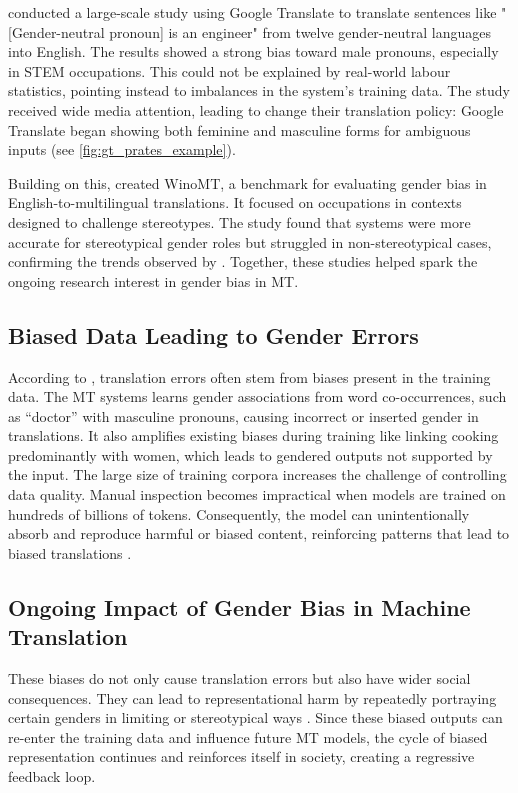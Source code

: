         \textcite{pratesAssessingGenderBias2019} conducted a large-scale study using Google Translate to translate sentences like "[Gender-neutral pronoun] is an engineer" from twelve gender-neutral languages into English. The results showed a strong bias toward male pronouns, especially in STEM occupations. This could not be explained by real-world labour statistics, pointing instead to imbalances in the system's training data. The study received wide media attention, leading \citeauthor{googleReducingGenderBias2018} to change their translation policy: Google Translate began showing both feminine and masculine forms for ambiguous inputs \parencite{googleReducingGenderBias2018} (see \autoref{fig:gt_prates_example}).

        Building on this, \textcite{stanovskyEvaluatingGenderBias2019} created WinoMT, a benchmark for evaluating gender bias in English-to-multilingual translations. It focused on occupations in contexts designed to challenge stereotypes. The study found that systems were more accurate for stereotypical gender roles but struggled in non-stereotypical cases, confirming the trends observed by \citeauthor{pratesAssessingGenderBias2019}.
        Together, these studies helped spark the ongoing research interest in gender bias in MT.

        \subsection{Biased Data Leading to Gender Errors}
        According to \textcite{ullmannGenderBiasMachine2022}, translation errors often stem from biases present in the training data. The MT systems learns gender associations from word co-occurrences, such as “doctor” with masculine pronouns, causing incorrect or inserted gender in translations. It also amplifies existing biases during training like linking cooking predominantly with women, which leads to gendered outputs not supported by the input. The large size of training corpora increases the challenge of controlling data quality. Manual inspection becomes impractical when models are trained on hundreds of billions of tokens. Consequently, the model can unintentionally absorb and reproduce harmful or biased content, reinforcing patterns that lead to biased translations \citep{ullmannGenderBiasMachine2022}.

    \subsection{Ongoing Impact of Gender Bias in Machine Translation}
        These biases do not only cause translation errors but also have wider social consequences. They can lead to representational harm by repeatedly portraying certain genders in limiting or stereotypical ways \parencite{stanczakSurveyGenderBias2021}. Since these biased outputs can re-enter the training data and influence future MT models, the cycle of biased representation continues and reinforces itself in society, creating a regressive feedback loop.

